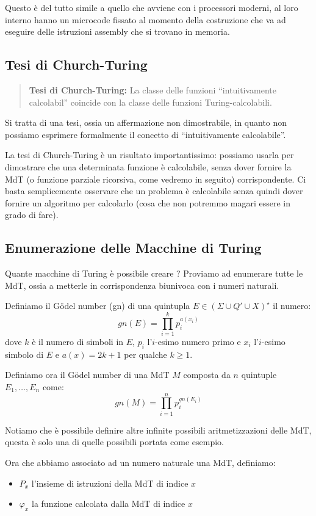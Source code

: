 \documentclass[a4paper,titlepage]{article}
\theoremstyle{definition}
\begin{document}
Questo è del tutto simile a quello che avviene con i processori moderni, al loro interno hanno un microcode fissato al momento della costruzione che va ad eseguire delle istruzioni assembly che si trovano in memoria.

\subsection{Tesi di Church-Turing}
\begin{quote}
	\textbf{Tesi di Church-Turing:} La classe delle funzioni ``intuitivamente calcolabil'' coincide con la classe delle funzioni Turing-calcolabili. 
\end{quote}

Si tratta di una tesi, ossia un affermazione non dimostrabile, in quanto non possiamo esprimere formalmente il concetto di ``intuitivamente calcolabile''. 

La tesi di Church-Turing è un risultato importantissimo: possiamo usarla per dimostrare che una determinata funzione è calcolabile, senza dover fornire la MdT (o funzione parziale ricorsiva, come vedremo in seguito) corrispondente. Ci basta semplicemente osservare che un problema è calcolabile senza quindi dover fornire un algoritmo per calcolarlo (cosa che non potremmo magari essere in grado di fare).

\subsection{Enumerazione delle Macchine di Turing}
Quante macchine di Turing è possibile creare ? Proviamo ad enumerare tutte le MdT, ossia a metterle in corrispondenza biunivoca con i numeri naturali. 

Definiamo il Gödel number (gn) di una quintupla $E\in (\Sigma\cup Q'\cup X)^\star$ il numero:
\[
	gn(E)=\prod_{i=1}^{k}p_i^{a(x_i)}
\]
dove $k$ è il numero di simboli in $E$, $p_i$ l'$i$-esimo numero primo e $x_i$ l'$i$-esimo simbolo di $E$ e $a(x)=2k+1$ per qualche $k\geq1$.

Definiamo ora il Gödel number di una MdT $M$ composta da $n$ quintuple $E_1,\dots,E_n$ come:
\[
	gn(M)=\prod_{i=1}^{n}p_i^{gn(E_i)}
\]

Notiamo che è possibile definire altre infinite possibili aritmetizzazioni delle MdT, questa è solo una di quelle possibili portata come esempio. 

Ora che abbiamo associato ad un numero naturale una MdT, definiamo: 
\begin{itemize}
	\item $P_x$ l'insieme di istruzioni della MdT di indice $x$
	\item $\varphi_x$ la funzione calcolata dalla MdT di indice $x$
\end{itemize}
\end{document}
